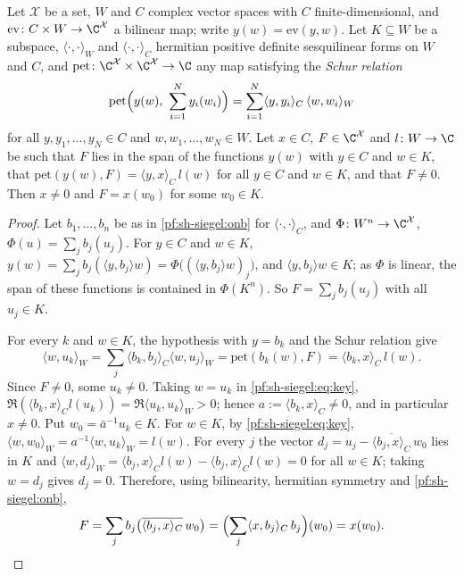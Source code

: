 \begin{proposition}\label{pf:sh-siegel:adjval}
Let $\mathcal X$ be a set, $W$ and $C$ complex vector spaces with $C$ finite-dimensional, and
$\mathrm{ev}\colon C\times W\to\C^{\mathcal X}$ a bilinear map; write $y(w)=\mathrm{ev}(y,w)$. Let $K\subseteq W$ be a
subspace, $\langle\cdot,\cdot\rangle_W$ and $\langle\cdot,\cdot\rangle_C$ hermitian positive definite sesquilinear
forms on $W$ and $C$, and $\mathrm{pet}\colon\C^{\mathcal X}\times\C^{\mathcal X}\to\C$ any map satisfying the
\emph{Schur relation}
\begin{equation}\label{pf:sh-siegel:eq:schur}
\mathrm{pet}\Bigl(y(w),\ \sum_{i=1}^Ny_i(w_i)\Bigr)=\sum_{i=1}^N\langle y,y_i\rangle_C\,\langle w,w_i\rangle_W
\end{equation}
for all $y,y_1,\dots,y_N\in C$ and $w,w_1,\dots,w_N\in W$. Let $x\in C$, $F\in\C^{\mathcal X}$ and $l\colon W\to\C$ be such
that $F$ lies in the span of the functions $y(w)$ with $y\in C$ and $w\in K$, that
$\mathrm{pet}(y(w),F)=\langle y,x\rangle_C\,l(w)$ for all $y\in C$ and $w\in K$, and that $F\ne0$. Then $x\ne0$ and $F=x(w_0)$
for some $w_0\in K$.
\end{proposition}

\begin{proof}
Let $b_1,\dots,b_n$ be as in \cref{pf:sh-siegel:onb} for $\langle\cdot,\cdot\rangle_C$, and
$\Phi\colon W^n\to\C^{\mathcal X}$, $\Phi(u)=\sum_jb_j(u_j)$. For $y\in C$ and $w\in K$,
$y(w)=\sum_jb_j(\langle y,b_j\rangle w)=\Phi\bigl((\langle y,b_j\rangle w)_j\bigr)$, and $\langle y,b_j\rangle w\in K$; as
$\Phi$ is linear, the span of these functions is contained in $\Phi(K^n)$. So $F=\sum_jb_j(u_j)$ with all $u_j\in K$.

For every $k$ and $w\in K$, the hypothesis with $y=b_k$ and the Schur relation give
\begin{equation}\label{pf:sh-siegel:eq:key}
\langle w,u_k\rangle_W=\sum_j\langle b_k,b_j\rangle_C\langle w,u_j\rangle_W=\mathrm{pet}(b_k(w),F)=\langle b_k,x\rangle_C\,l(w).
\end{equation}
Since $F\ne0$, some $u_k\ne0$. Taking $w=u_k$ in \eqref{pf:sh-siegel:eq:key}, $\Re(\langle b_k,x\rangle_Cl(u_k))=
\Re\langle u_k,u_k\rangle_W>0$; hence $a:=\langle b_k,x\rangle_C\ne0$, and in particular $x\ne0$. Put
$w_0=\bar a^{-1}u_k\in K$. For $w\in K$, by \eqref{pf:sh-siegel:eq:key},
$\langle w,w_0\rangle_W=a^{-1}\langle w,u_k\rangle_W=l(w)$. For every $j$ the vector $d_j=u_j-\overline{\langle
b_j,x\rangle_C}\,w_0$ lies in $K$ and $\langle w,d_j\rangle_W=\langle b_j,x\rangle_Cl(w)-\langle b_j,x\rangle_Cl(w)=0$ for
all $w\in K$; taking $w=d_j$ gives $d_j=0$. Therefore, using bilinearity, hermitian symmetry and \cref{pf:sh-siegel:onb},
\[
F=\sum_jb_j\bigl(\overline{\langle b_j,x\rangle_C}\,w_0\bigr)=\Bigl(\sum_j\langle x,b_j\rangle_C\,b_j\Bigr)(w_0)=x(w_0).
\qedhere
\]
\end{proof}


